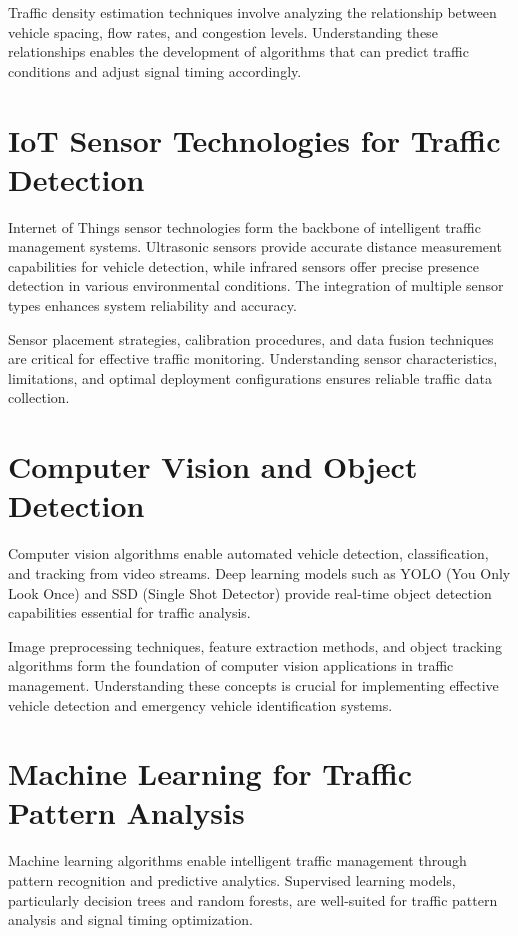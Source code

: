 \documentclass[12pt]{report}
\begin{document}
Traffic density estimation techniques involve analyzing the relationship between vehicle spacing, flow rates, and congestion levels. Understanding these relationships enables the development of algorithms that can predict traffic conditions and adjust signal timing accordingly.

\section{IoT Sensor Technologies for Traffic Detection}

Internet of Things sensor technologies form the backbone of intelligent traffic management systems. Ultrasonic sensors provide accurate distance measurement capabilities for vehicle detection, while infrared sensors offer precise presence detection in various environmental conditions. The integration of multiple sensor types enhances system reliability and accuracy.

Sensor placement strategies, calibration procedures, and data fusion techniques are critical for effective traffic monitoring. Understanding sensor characteristics, limitations, and optimal deployment configurations ensures reliable traffic data collection.

\section{Computer Vision and Object Detection}

Computer vision algorithms enable automated vehicle detection, classification, and tracking from video streams. Deep learning models such as YOLO (You Only Look Once) and SSD (Single Shot Detector) provide real-time object detection capabilities essential for traffic analysis.

Image preprocessing techniques, feature extraction methods, and object tracking algorithms form the foundation of computer vision applications in traffic management. Understanding these concepts is crucial for implementing effective vehicle detection and emergency vehicle identification systems.

\section{Machine Learning for Traffic Pattern Analysis}

Machine learning algorithms enable intelligent traffic management through pattern recognition and predictive analytics. Supervised learning models, particularly decision trees and random forests, are well-suited for traffic pattern analysis and signal timing optimization.
\end{document}
